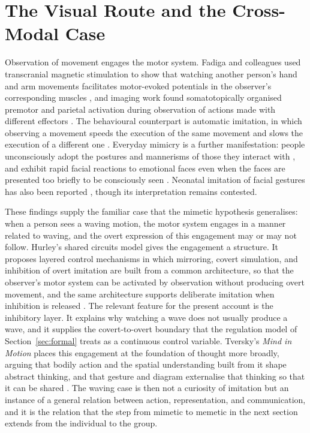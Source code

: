 \documentclass[11pt]{article}
\theoremstyle{plain}
\theoremstyle{definition}
\begin{document}
\section{The Visual Route and the Cross-Modal Case}\label{sec:visual}

Observation of movement engages the motor system. Fadiga and colleagues used transcranial magnetic stimulation to show that watching another person's hand and arm movements facilitates motor-evoked potentials in the observer's corresponding muscles \citep{fadiga1995}, and imaging work found somatotopically organised premotor and parietal activation during observation of actions made with different effectors \citep{buccino2001}. The behavioural counterpart is automatic imitation, in which observing a movement speeds the execution of the same movement and slows the execution of a different one \citep{brass2001,heyes2011}. Everyday mimicry is a further manifestation: people unconsciously adopt the postures and mannerisms of those they interact with \citep{chartrand1999}, and exhibit rapid facial reactions to emotional faces even when the faces are presented too briefly to be consciously seen \citep{dimberg2000}. Neonatal imitation of facial gestures has also been reported \citep{meltzoff1977}, though its interpretation remains contested.

These findings supply the familiar case that the mimetic hypothesis generalises: when a person sees a waving motion, the motor system engages in a manner related to waving, and the overt expression of this engagement may or may not follow. Hurley's shared circuits model gives the engagement a structure. It proposes layered control mechanisms in which mirroring, covert simulation, and inhibition of overt imitation are built from a common architecture, so that the observer's motor system can be activated by observation without producing overt movement, and the same architecture supports deliberate imitation when inhibition is released \citep{hurley1998,hurley2008,hurley2005}. The relevant feature for the present account is the inhibitory layer. It explains why watching a wave does not usually produce a wave, and it supplies the covert-to-overt boundary that the regulation model of Section~\ref{sec:formal} treats as a continuous control variable. Tversky's \textit{Mind in Motion} places this engagement at the foundation of thought more broadly, arguing that bodily action and the spatial understanding built from it shape abstract thinking, and that gesture and diagram externalise that thinking so that it can be shared \citep{tversky2019}. The waving case is then not a curiosity of imitation but an instance of a general relation between action, representation, and communication, and it is the relation that the step from mimetic to memetic in the next section extends from the individual to the group.
\end{document}
